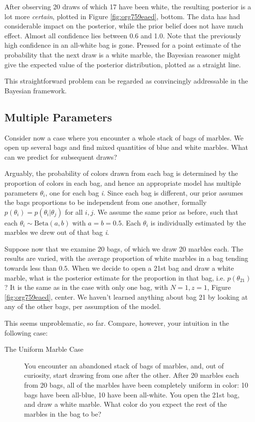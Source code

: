 \documentclass[11pt, a4paper]{article}
\begin{document}
After observing 20 draws of which 17 have been white, the resulting
posterior is a lot more \emph{certain}, plotted in Figure \ref{fig:org759eaed},
bottom. The data has had considerable impact on the posterior, while the prior
belief does not have much effect. Almost all confidence lies between 0.6 and
1.0. Note that the previously high confidence in an all-white bag is gone.
Pressed for a point estimate of the probability that the next draw is a white
marble, the Bayesian reasoner might give the expected value of the posterior
distribution, plotted as a straight line.

This straightforward problem can be regarded as convincingly addressable in the Bayesian
framework.

\subsection{Multiple Parameters}
\label{sec:org26216a1}

Consider now a case where you encounter a whole stack of bags of marbles. We
open up several bags and find mixed quantities of blue and white marbles. What
can we predict for subsequent draws?

Arguably, the probability of colors drawn from each bag is determined by the
proportion of colors in each bag, and hence an appropriate model has multiple
parameters \(\theta_i\), one for each bag \emph{i}. Since each bag is different,
our prior assumes the bags proportions to be independent from one another, formally \({
  p(\theta_i) = p(\theta_i|\theta_j) }\) for all \(i,j\). We assume the same
prior as before, such that each \(\theta_i \sim \text{Beta}(a,b)\) with
\(a=b=0.5\). Each \(\theta_i\) is individually estimated by the marbles we drew
out of that bag \emph{i}.

Suppose now that we examine 20 bags, of which we draw 20 marbles each. The
results are varied, with the average proportion of white marbles in a bag
tending towards less than \(0.5\). When we decide to open a 21st bag and draw a
white marble, what is the posterior estimate for the proportion in that bag,
i.e. \(p(\theta_{21})\)? It is the same as in the case with only one bag, with
\(N=1, z=1\), Figure \ref{fig:org759eaed}, center. We haven't learned anything
about bag 21 by looking at any of the other bags, per assumption of the model.

This seems unproblematic, so far. Compare, however, your intuition in the
following case:

\begin{description}
\item[{The Uniform Marble Case}] You encounter an abandoned stack of bags of
  marbles, and, out of curiosity, start drawing from one after the other. After
  20 marbles each from 20 bags, all of the marbles have been completely uniform
  in color: 10 bags have been all-blue, 10 have been all-white. You open the
  21st bag, and draw a white marble. What color do you expect the rest of the
  marbles in the bag to be?
\end{description}
\end{document}
